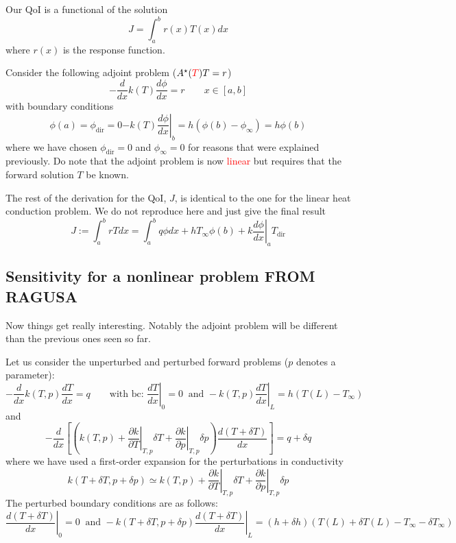 \documentclass[11pt]{article}
\newcommand{\be}{\begin{equation}}
\newcommand{\ee}{\end{equation}}
\newcommand{\tcr}[1]{\textcolor{red}{#1}}
\begin{document}
Our QoI is a functional of the solution
\be
\label{eq:ex_heat_conduction_qoi}
J = \int_a^b r(x) T(x) dx
\ee
where $r(x)$ is the response function.

Consider the following adjoint problem ($A^\star(\tcr{T})T=r$)
\be
\label{eq:ex_heat_conduction_adjoint}
-\frac{d}{dx}k(T)\frac{d\phi}{dx}=r \qquad x\in [a,b]
\ee
with boundary conditions
\begin{subequations}
\label{eq:ex_heat_conduction_bc_adjoint}
\be
\phi(a) = \phi_{\text{dir}} = 0 
\ee
\be
-k(T) \left.\frac{d\phi}{dx}\right|_b = h(\phi(b)-\phi_{\infty}) = h\phi(b)
\ee
\end{subequations}
where we have chosen $\phi_{\text{dir}} = 0$ and $\phi_{\infty}=0$ for reasons that were explained previously. Do note that the adjoint problem is now \tcr{linear} but requires that the forward solution $T$ be known.

The rest of the derivation for the QoI, $J$, is identical to the one for the linear heat conduction problem. We do not reproduce here and just give the final result
\be
\boxed{
J := \int_a^b rT dx = \int_a^b q \phi dx + h T_{\infty} \phi(b) + \left.k\frac{d\phi}{dx}\right|_a T_{\text{dir}}
}
\ee


\subsection{Sensitivity for a nonlinear problem FROM RAGUSA}

Now things get really interesting. Notably the adjoint problem will be different than the previous ones seen so far.

Let us consider the unperturbed and perturbed forward problems ($p$ denotes a parameter):
\[
-\frac{d}{dx}k(T,p)\frac{dT}{dx} = q \qquad \text{with bc: } \left.\frac{dT}{dx}\right|_0=0 \ \text{  and } -k(T,p)\left.\frac{dT}{dx}\right|_L=h(T(L)-T_\infty)
\]
and
\[
-\frac{d}{dx}\left[\left(k(T,p)+\left.\frac{\partial k}{\partial T}\right|_{T,p}\delta T+\left.\frac{\partial k}{\partial p}\right|_{T,p}\delta p\right) \frac{d(T+\delta T)}{dx}\right] = q+\delta q \]
where we have used a first-order expansion for the perturbations in conductivity
\[
k(T+\delta T, p+\delta p) \simeq k(T,p)+\left.\frac{\partial k}{\partial T}\right|_{T,p}\delta T+\left.\frac{\partial k}{\partial p}\right|_{T,p}\delta p
\]
The perturbed boundary conditions are as follows: 
\[
 \left.\frac{d(T+\delta T)}{dx}\right|_0=0 \ \text{ and } -k(T+\delta T, p+\delta p)\left.\frac{d(T+\delta T)}{dx}\right|_L=(h+\delta h)(T(L)+\delta T(L)-T_\infty-\delta T_\infty)
\]
\end{document}
